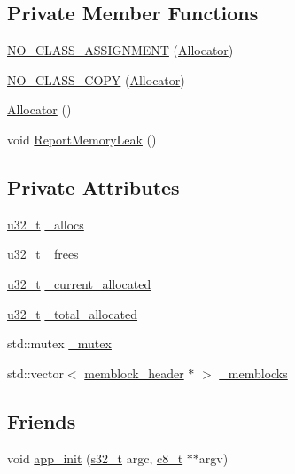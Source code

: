 \subsection*{Private Member Functions}
\begin{DoxyCompactItemize}
\item 
\hyperlink{class_allocator_a124b907bf555ce43c370857ad98b3b46}{N\-O\-\_\-\-C\-L\-A\-S\-S\-\_\-\-A\-S\-S\-I\-G\-N\-M\-E\-N\-T} (\hyperlink{class_allocator}{Allocator})
\item 
\hyperlink{class_allocator_a33b1ff5ecdda6afcfae215629a885118}{N\-O\-\_\-\-C\-L\-A\-S\-S\-\_\-\-C\-O\-P\-Y} (\hyperlink{class_allocator}{Allocator})
\item 
\hyperlink{class_allocator_acd81cd6a9337a081c558f89661b623d7}{Allocator} ()
\item 
void \hyperlink{class_allocator_a9aa138078a8697e4f8769cf5a26efb1d}{Report\-Memory\-Leak} ()
\end{DoxyCompactItemize}
\subsection*{Private Attributes}
\begin{DoxyCompactItemize}
\item 
\hyperlink{types_8h_a0c0a490ab7fa397be6c764a935cc5ea4}{u32\-\_\-t} \hyperlink{class_allocator_aab4bbddc6f90d86d41d9884dc9815be3}{\-\_\-allocs}
\item 
\hyperlink{types_8h_a0c0a490ab7fa397be6c764a935cc5ea4}{u32\-\_\-t} \hyperlink{class_allocator_a2b00d5fffca1bc0ba5fc82cffc582799}{\-\_\-frees}
\item 
\hyperlink{types_8h_a0c0a490ab7fa397be6c764a935cc5ea4}{u32\-\_\-t} \hyperlink{class_allocator_a67b52b7b9bd22b33661529c5743fe2d9}{\-\_\-current\-\_\-allocated}
\item 
\hyperlink{types_8h_a0c0a490ab7fa397be6c764a935cc5ea4}{u32\-\_\-t} \hyperlink{class_allocator_a3a87f7139ce300ab94ea2fb7748922e7}{\-\_\-total\-\_\-allocated}
\item 
std\-::mutex \hyperlink{class_allocator_aba61a1bd22a0ba615f0c3030ca3a4b2a}{\-\_\-mutex}
\item 
std\-::vector$<$ \hyperlink{structmemblock__header}{memblock\-\_\-header} $\ast$ $>$ \hyperlink{class_allocator_a14b439fa46e392aca969b4c4cf99fd19}{\-\_\-memblocks}
\end{DoxyCompactItemize}
\subsection*{Friends}
\begin{DoxyCompactItemize}
\item 
void \hyperlink{class_allocator_a1403d1314bafa072ebbdb057833ed608}{app\-\_\-init} (\hyperlink{types_8h_aeeae8d6781b7e821dd3e743202314d66}{s32\-\_\-t} argc, \hyperlink{types_8h_a93d4fa6fb79d31926edb1d51e2f502d2}{c8\-\_\-t} $\ast$$\ast$argv)
\end{DoxyCompactItemize}


